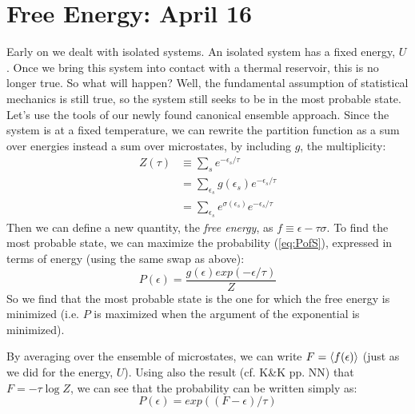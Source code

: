 \section{Free Energy: April 16}
Early on we dealt with isolated systems. An isolated system has a 
fixed energy, $U$. Once we bring this system into contact with a
thermal reservoir, this is no longer true. So what will happen?
Well, the fundamental assumption of statistical mechanics is still 
true, so the system still seeks to be in the most probable state. \\

Let's use the tools of our newly found canonical ensemble approach.
Since the system is at a fixed temperature, we can rewrite the
partition function as a sum over energies instead a sum over microstates,
by including $g$, the multiplicity:
\begin{align}
Z(\tau) &\equiv \sum_s e^{-\epsilon_s/\tau} \\
        &= \sum_{\epsilon_s} g(\epsilon_s) e^{-\epsilon_s/\tau} \\
        &= \sum_{\epsilon_s} e^{\sigma(\epsilon_s)} e^{-\epsilon_s/\tau}
\end{align}
Then we can define a new quantity, the \emph{free energy}, as
$f \equiv \epsilon - \tau \sigma$. To find the most probable state, we
can maximize the probability (\cref{eq:PofS}), expressed in terms of energy (using the
same swap as above):
\begin{equation}
P(\epsilon) = \frac{g(\epsilon) exp(-\epsilon/\tau)}{Z}
\end{equation}
So we find that the most probable state is the one for which the free energy is minimized (i.e. $P$ is maximized when the argument of the exponential is minimized).

By averaging over the ensemble of microstates, we can write 
$F = \Braket{f(\epsilon)}$ (just as we did for the energy, $U$). Using also the result (cf. K\&K pp. NN) that $F = -\tau \log Z$, we can see that the probability can be written simply as:
\begin{equation}
P(\epsilon) = exp((F - \epsilon)/\tau)
\end{equation}